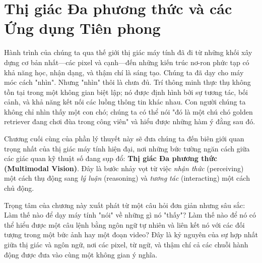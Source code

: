 \chapter{Thị giác Đa phương thức và các Ứng dụng Tiên phong}
\label{chap:multimodal_and_advanced_applications}

Hành trình của chúng ta qua thế giới thị giác máy tính đã đi từ những khối xây dựng cơ bản nhất—các pixel và cạnh—đến những kiến trúc nơ-ron phức tạp có khả năng học, nhận dạng, và thậm chí là sáng tạo. Chúng ta đã dạy cho máy móc cách "nhìn". Nhưng "nhìn" thôi là chưa đủ. Trí thông minh thực thụ không tồn tại trong một không gian biệt lập; nó được định hình bởi sự tương tác, bối cảnh, và khả năng kết nối các luồng thông tin khác nhau. Con người chúng ta không chỉ nhìn thấy một con chó; chúng ta có thể nói "đó là một chú chó golden retriever đang chơi đùa trong công viên" và hiểu được những hàm ý đằng sau đó.

Chương cuối cùng của phần lý thuyết này sẽ đưa chúng ta đến biên giới quan trọng nhất của thị giác máy tính hiện đại, nơi những bức tường ngăn cách giữa các giác quan kỹ thuật số đang sụp đổ: \textbf{Thị giác Đa phương thức (Multimodal Vision)}. Đây là bước nhảy vọt từ việc \textit{nhận thức} (perceiving) một cách thụ động sang \textit{lý luận} (reasoning) và \textit{tương tác} (interacting) một cách chủ động.

Trọng tâm của chương này xuất phát từ một câu hỏi đơn giản nhưng sâu sắc: Làm thế nào để dạy máy tính "nói" về những gì nó "thấy"? Làm thế nào để nó có thể hiểu được một câu lệnh bằng ngôn ngữ tự nhiên và liên kết nó với các đối tượng trong một bức ảnh hay một đoạn video? Đây là kỷ nguyên của sự hợp nhất giữa thị giác và ngôn ngữ, nơi các pixel, từ ngữ, và thậm chí cả các chuỗi hành động được đưa vào cùng một không gian ý nghĩa.

